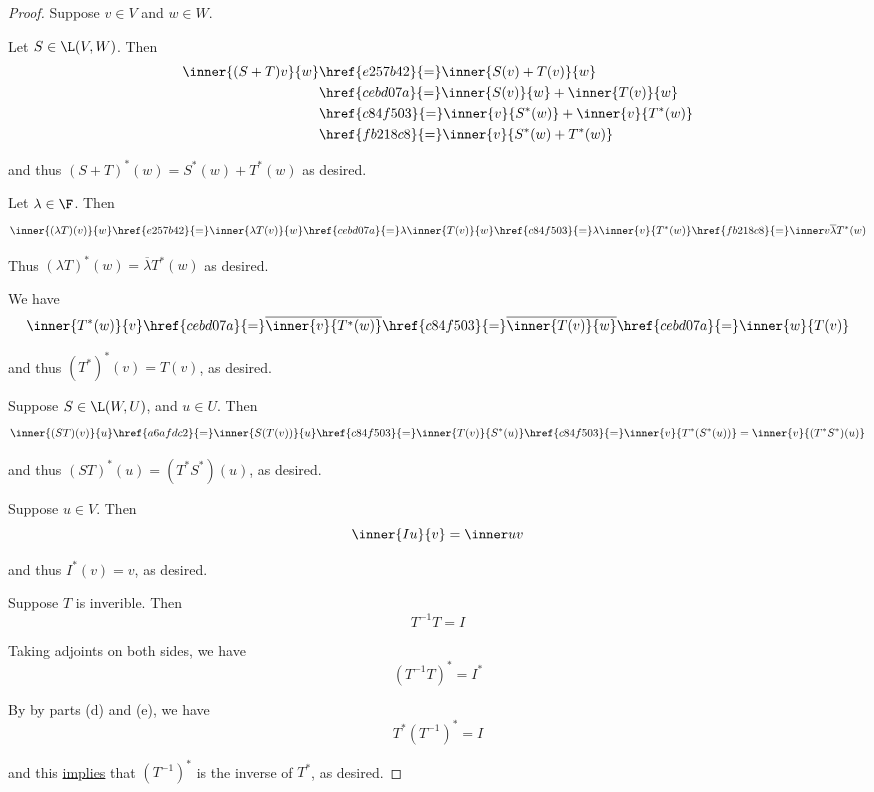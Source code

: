 \begin{proof}
  Suppose $v\in V$ and $w\in W$.

   Let $S\in\L(V,W)$. Then
  \begin{align*}
    \inner{(S+T)v}{w} &\href{e257b42}{=}\inner{S(v)+T(v)}{w}                \\
                      &\href{cebd07a}{=}\inner{S(v)}{w}+\inner{T(v)}{w}     \\
                      &\href{c84f503}{=}\inner{v}{S^*(w)}+\inner{v}{T^*(w)} \\
                      &\href{fb218c8}{=}\inner{v}{S^*(w)+T^*(w)}
  \end{align*}

  and thus $(S+T)^*(w)=S^*(w)+T^*(w)$ as desired.

   Let $\lambda\in\F$. Then
  $$
    \inner{(\lambda T)(v)}{w}
    \href{e257b42}{=}\inner{\lambda T(v)}{w}
    \href{cebd07a}{=}\lambda\inner{T(v)}{w}
    \href{c84f503}{=}\lambda\inner{v}{T^*(w)}
    \href{fb218c8}{=}\inner v{\overline\lambda T^*(w)}
  $$

  Thus $(\lambda T)^*(w)=\overline\lambda T^*(w)$ as desired.

   We have
  $$
    \inner{T^*(w)}{v}
    \href{cebd07a}{=}\overline{\inner{v}{T^*(w)}}
    \href{c84f503}{=}\overline{\inner{T(v)}{w}}
    \href{cebd07a}{=}\inner{w}{T(v)}
  $$

  and thus $(T^*)^*(v)=T(v)$, as desired.

   Suppose $S\in\L(W,U)$, and $u\in U$. Then
  $$
    \inner{(ST)(v)}{u}
    \href{a6afdc2}{=}\inner{S(T(v))}{u}
    \href{c84f503}{=}\inner{T(v)}{S^*(u)}
    \href{c84f503}{=}\inner{v}{T^*(S^*(u))}
    =\inner{v}{(T^*S^*)(u)}
  $$

  and thus $(ST)^*(u)=(T^*S^*)(u)$, as desired.

   Suppose $u\in V$. Then
  $$
    \inner{Iu}{v}=\inner uv
  $$

  and thus $I^*(v)=v$, as desired.

   Suppose $T$ is inverible. Then
  $$
    T^{-1}T=I
  $$

  Taking adjoints on both sides, we have
  $$
    (T^{-1}T)^*=I^*
  $$

  By by parts (d) and (e), we have
  $$
    T^*(T^{-1})^*=I
  $$

  and this \href{e1ba7ee}{implies} that $(T^{-1})^*$ is the inverse of $T^*$,
  as desired.
\end{proof}

